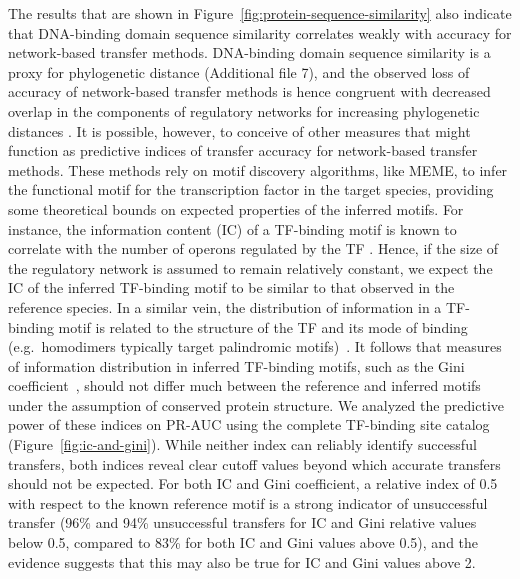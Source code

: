 The results that are shown in Figure~\ref{fig:protein-sequence-similarity} also
indicate that DNA-binding domain sequence similarity correlates weakly with
accuracy for network-based transfer methods. DNA-binding domain sequence
similarity is a proxy for phylogenetic distance (Additional file 7), and the
observed loss of accuracy of network-based transfer methods is hence congruent
with decreased overlap in the components of regulatory networks for increasing
phylogenetic distances \cite{venancio2009reconstructing, baumbach2010power,
  price2007orthologous}. It is possible, however, to conceive of other measures
that might function as predictive indices of transfer accuracy for
network-based transfer methods. These methods rely on motif discovery
algorithms, like MEME, to infer the functional motif for the transcription
factor in the target species, providing some theoretical bounds on expected
properties of the inferred motifs. For instance, the information content (IC)
of a TF-binding motif is known to correlate with the number of operons
regulated by the TF \cite{schneider1986information}. Hence, if the size of the
regulatory network is assumed to remain relatively constant, we expect the IC
of the inferred TF-binding motif to be similar to that observed in the
reference species. In a similar vein, the distribution of information in a
TF-binding motif is related to the structure of the TF and its mode of binding
(e.g.\ homodimers typically target palindromic
motifs)~\cite{ravcheev2014comparative, gelfand1999recognition,
  schneider1996reading}. It follows that measures of information distribution
in inferred TF-binding motifs, such as the Gini
coefficient~\cite{dorfman1979formula}, should not differ much between the
reference and inferred motifs under the assumption of conserved protein
structure. We analyzed the predictive power of these indices on PR-AUC using
the complete TF-binding site catalog (Figure~\ref{fig:ic-and-gini}). While
neither index can reliably identify successful transfers, both indices reveal
clear cutoff values beyond which accurate transfers should not be expected. For
both IC and Gini coefficient, a relative index of 0.5 with respect to the known
reference motif is a strong indicator of unsuccessful transfer (96\% and 94\%
unsuccessful transfers for IC and Gini relative values below 0.5, compared to
83\% for both IC and Gini values above 0.5), and the evidence suggests that
this may also be true for IC and Gini values above 2.

